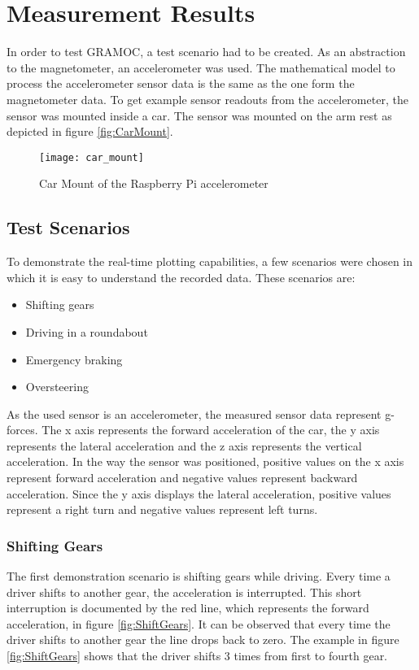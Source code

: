 \chapter{Measurement Results}
\label{ch:MeasureRes}

\author{Nico Leidenfrost}
%
In order to test GRAMOC, a test scenario had to be created. As an abstraction to the magnetometer, an accelerometer was used. The mathematical model to process the accelerometer sensor data is the same as the one form the magnetometer data. To get example sensor readouts from the accelerometer, the sensor was mounted inside a car. The sensor was mounted on the arm rest as depicted in figure \vref{fig:CarMount}.

\begin{figure}[H]
    \centering
    \texttt{[image: car\_mount]}
    \caption{Car Mount of the Raspberry Pi accelerometer}
    \label{fig:CarMount}
\end{figure}

\section{Test Scenarios}
To demonstrate the real-time plotting capabilities, a few scenarios were chosen in which it is easy to understand the recorded data. These scenarios are:

\begin{itemize}
    \item Shifting gears
    \item Driving in a roundabout
    \item Emergency braking
    \item Oversteering
\end{itemize}

As the used sensor is an accelerometer, the measured sensor data represent g-forces. The x axis represents the forward acceleration of the car, the y axis represents the lateral acceleration and the z axis represents the vertical acceleration. In the way the sensor was positioned, positive values on the x axis represent forward acceleration and negative values represent backward acceleration. Since the y axis displays the lateral acceleration, positive values represent a right turn and negative values represent left turns.

\subsection{Shifting Gears}
The first demonstration scenario is shifting gears while driving. Every time a driver shifts to another gear, the acceleration is interrupted. This short interruption is documented by the red line, which represents the forward acceleration, in figure \vref{fig:ShiftGears}. It can be observed that every time the driver shifts to another gear the line drops back to zero. The example in figure \vref{fig:ShiftGears} shows that the driver shifts 3 times from  first to fourth gear.

